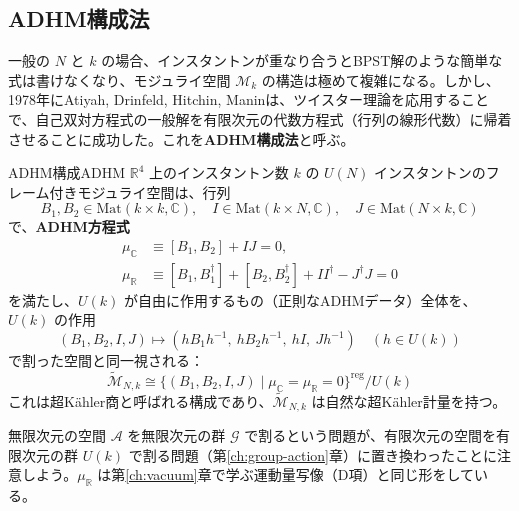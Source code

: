 \documentclass[uplatex, dvipdfmx, book]{jsbook}
\let\origsubsection\subsection
\let\origsubsubsection\subsubsection
\renewcommand{\section}{\origsubsection}
\renewcommand{\subsection}{\origsubsubsection}
\renewcommand{\subsubsection}{\paragraph}
\begin{document}
\section{ADHM構成法}
\label{sec:adhm}

一般の $N$ と $k$ の場合、インスタントンが重なり合うとBPST解のような簡単な式は書けなくなり、モジュライ空間 $\mathcal{M}_{k}$ の構造は極めて複雑になる。しかし、1978年にAtiyah, Drinfeld, Hitchin, Maninは、ツイスター理論を応用することで、自己双対方程式の一般解を有限次元の代数方程式（行列の線形代数）に帰着させることに成功した。これを\textbf{ADHM構成法}と呼ぶ\cite{adhm1978}。

\begin{mythm}{ADHM構成}{ADHM}
$\mathbb{R}^4$ 上のインスタントン数 $k$ の $U(N)$ インスタントンのフレーム付きモジュライ空間は、行列
\begin{equation*}
    B_1, B_2 \in \mathrm{Mat}(k \times k, \mathbb{C}), \quad I \in \mathrm{Mat}(k \times N, \mathbb{C}), \quad J \in \mathrm{Mat}(N \times k, \mathbb{C})
\end{equation*}
で、\textbf{ADHM方程式}
\begin{align*}
    \mu_{\mathbb{C}} &\equiv [B_1, B_2] + IJ = 0, \\
    \mu_{\mathbb{R}} &\equiv [B_1, B_1^\dagger] + [B_2, B_2^\dagger] + II^\dagger - J^\dagger J = 0
\end{align*}
を満たし、$U(k)$ が自由に作用するもの（正則なADHMデータ）全体を、$U(k)$ の作用
\begin{equation*}
    (B_1, B_2, I, J) \mapsto (h B_1 h^{-1},\ h B_2 h^{-1},\ h I,\ J h^{-1}) \quad (h \in U(k))
\end{equation*}
で割った空間と同一視される：
\begin{equation*}
    \widetilde{\mathcal{M}}_{N,k} \cong \{ (B_1, B_2, I, J) \mid \mu_{\mathbb{C}} = \mu_{\mathbb{R}} = 0 \}^{\text{reg}} / U(k)
\end{equation*}
これは超K\"ahler商と呼ばれる構成であり、$\widetilde{\mathcal{M}}_{N,k}$ は自然な超K\"ahler計量を持つ。
\end{mythm}

無限次元の空間 $\mathcal{A}$ を無限次元の群 $\mathcal{G}$ で割るという問題が、有限次元の空間を有限次元の群 $U(k)$ で割る問題（第\ref{ch:group-action}章）に置き換わったことに注意しよう。$\mu_{\mathbb{R}}$ は第\ref{ch:vacuum}章で学ぶ運動量写像（D項）と同じ形をしている。
\end{document}
